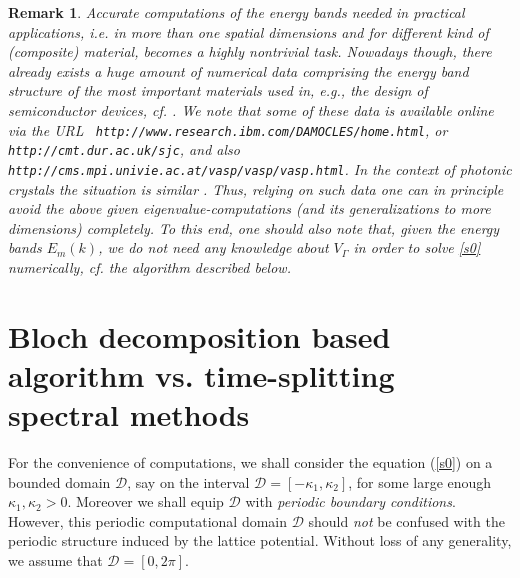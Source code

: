 \documentclass[leqno,final]{siamltex}
\newtheorem{remark}{Remark}[section]
\numberwithin{equation}{section}
\newcounter{me}
\begin{document}
\begin{remark}\label{rem}
Accurate computations of the energy bands needed in practical
applications, {{\sl i.e.\/ }} in more than one spatial dimensions and for
different kind of (composite) material, becomes a highly
nontrivial task. Nowadays though, there already exists a huge
amount of numerical data comprising the energy band structure of
the most important materials used in, {{\sl e.g.\/}}, the design of
semiconductor devices, {{\sl cf.\/ }} \cite{FL, JC, LVF}. We note that some
of these data is available online via the URL {\tt
http://www.research.ibm.com/DAMOCLES/home.html}, or {\tt
http://cmt.dur.ac.uk/sjc}, and also {\tt
http://cms.mpi.univie.ac.at/vasp/vasp/vasp.html}. In the context
of photonic crystals the situation is similar \cite{HFKW}. Thus,
relying on such data one can in principle avoid the above given
eigenvalue-computations (and its generalizations to more
dimensions) completely. To this end, one should also note that,
given the energy bands $E_m(k)$, we do not need any knowledge
about $V_\Gamma$ in order to solve \eqref{s0} numerically, {{\sl cf.\/ }} the
algorithm described below.
\end{remark}

\section{Bloch decomposition based algorithm vs. time-splitting
spectral methods}\label{BDTSS}
For the convenience of computations, we shall consider the
equation (\ref{s0}) on a bounded domain $\mathcal D$, say on the
interval $\mathcal D= [-\kappa_1, \kappa_2 ]$, for some large
enough $\kappa_1, \kappa_2 >0$. Moreover we shall equip $\mathcal
D$ with \emph{periodic boundary conditions}. However, this
periodic computational domain $\mathcal D$ should \emph{not} be
confused with the periodic structure induced by the lattice
potential. Without loss of any generality, we assume that
$\mathcal D=[0,2\pi]$.
\end{document}
